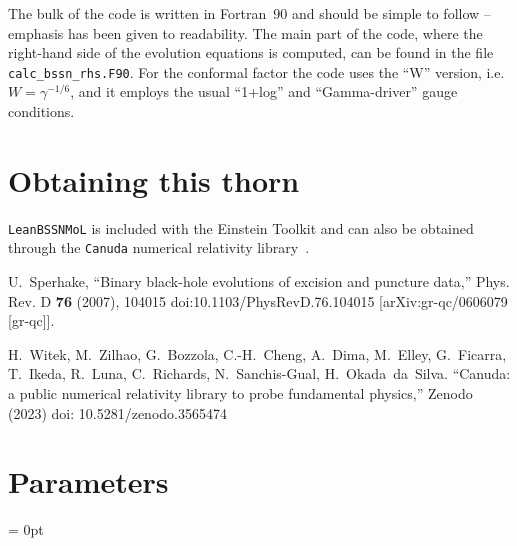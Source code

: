 The bulk of the code is written in Fortran~90 and should be simple to follow -- emphasis has been given to readability. The main part of the code, where the right-hand side of the evolution equations is computed, can be found in the file \texttt{calc\_bssn\_rhs.F90}.
%
For the conformal factor the code uses the ``W'' version, i.e.\ $W=\gamma^{-1/6}$, and it employs the usual ``1+log'' and ``Gamma-driver'' gauge conditions.


\section{Obtaining this thorn}

\texttt{LeanBSSNMoL} is included with the Einstein Toolkit and can also be obtained through the \texttt{Canuda} numerical relativity library~\cite{Canuda}.


\begin{thebibliography}{9}

U.~Sperhake,
``Binary black-hole evolutions of excision and puncture data,''
Phys. Rev. D \textbf{76} (2007), 104015
doi:10.1103/PhysRevD.76.104015
[arXiv:gr-qc/0606079 [gr-qc]].

H.~Witek, M.~Zilhao, G.~Bozzola, C.-H.~Cheng, A.~Dima, M.~Elley, G.~Ficarra, T.~Ikeda, R.~Luna, C.~Richards, N.~Sanchis-Gual, H.~Okada~da~Silva.
``Canuda: a public numerical relativity library to probe fundamental physics,''
Zenodo (2023)
doi: 10.5281/zenodo.3565474

\end{thebibliography}




\section{Parameters} 


\parskip = 0pt

\setlength{\tableWidth}{160mm}

\setlength{\paraWidth}{\tableWidth}
\setlength{\descWidth}{\tableWidth}
\settowidth{\maxVarWidth}{impose\_conf\_fac\_floor\_at\_initial}

\addtolength{\paraWidth}{-\maxVarWidth}
\addtolength{\paraWidth}{-\columnsep}
\addtolength{\paraWidth}{-\columnsep}
\addtolength{\paraWidth}{-\columnsep}

